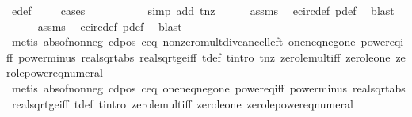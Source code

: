 \begin{isabellebody}
\ e{\isacharprime}{\isacharunderscore}def\isanewline
\ \ \ \ \isamarkupfalse%
{\isacharparenleft}cases{\isacharparenright}\isanewline
\ \ \ \ \ \ \ \ \ \ \isamarkupfalse%
{\isacharparenleft}simp\ add{\isacharcolon}\ t{\isacharunderscore}nz{\isacharparenright}\isanewline
\ \ \ \ \isamarkupfalse%
\ assms{\isacharparenleft}{}{\isacharparenright}\ \isamarkupfalse%
\ e{\isacharunderscore}circ{\isacharunderscore}def\ p{\isacharunderscore}def\ \isamarkupfalse%
\ blast\isanewline
\ \ \ \ \isamarkupfalse%
\ assms{\isacharparenleft}{}{\isacharparenright}\ \isamarkupfalse%
\ e{\isacharunderscore}circ{\isacharunderscore}def\ p{\isacharunderscore}def\ \isamarkupfalse%
\ blast\isanewline
\ \ \ \ \isamarkupfalse%
\ {\isacharparenleft}metis\ abs{\isacharunderscore}of{\isacharunderscore}nonneg\ c{\isacharunderscore}d{\isacharunderscore}pos\ c{\isacharunderscore}eq{\isacharunderscore}{}\ nonzero{\isacharunderscore}mult{\isacharunderscore}div{\isacharunderscore}cancel{\isacharunderscore}left\ one{\isacharunderscore}neq{\isacharunderscore}neg{\isacharunderscore}one\ power{}{\isacharunderscore}eq{\isacharunderscore}{}{\isacharunderscore}iff\ power{}{\isacharunderscore}minus\ real{\isacharunderscore}sqrt{\isacharunderscore}abs\ real{\isacharunderscore}sqrt{\isacharunderscore}ge{\isacharunderscore}{}{\isacharunderscore}iff\ t{\isacharunderscore}def\ t{\isacharunderscore}intro\ t{\isacharunderscore}nz\ zero{\isacharunderscore}le{\isacharunderscore}mult{\isacharunderscore}iff\ zero{\isacharunderscore}le{\isacharunderscore}one\ zero{\isacharunderscore}le{\isacharunderscore}power{\isacharunderscore}eq{\isacharunderscore}numeral{\isacharparenright}\isanewline
\ \ \ \ \isamarkupfalse%
\ {\isacharparenleft}metis\ abs{\isacharunderscore}of{\isacharunderscore}nonneg\ c{\isacharunderscore}d{\isacharunderscore}pos\ c{\isacharunderscore}eq{\isacharunderscore}{}\ one{\isacharunderscore}neq{\isacharunderscore}neg{\isacharunderscore}one\ power{}{\isacharunderscore}eq{\isacharunderscore}{}{\isacharunderscore}iff\ power{}{\isacharunderscore}minus\ real{\isacharunderscore}sqrt{\isacharunderscore}abs\ real{\isacharunderscore}sqrt{\isacharunderscore}ge{\isacharunderscore}{}{\isacharunderscore}iff\ t{\isacharunderscore}def\ t{\isacharunderscore}intro\ zero{\isacharunderscore}le{\isacharunderscore}mult{\isacharunderscore}iff\ zero{\isacharunderscore}le{\isacharunderscore}one\ zero{\isacharunderscore}le{\isacharunderscore}power{\isacharunderscore}eq{\isacharunderscore}numeral{\isacharparenright}\isanewline

\end{isabellebody}
